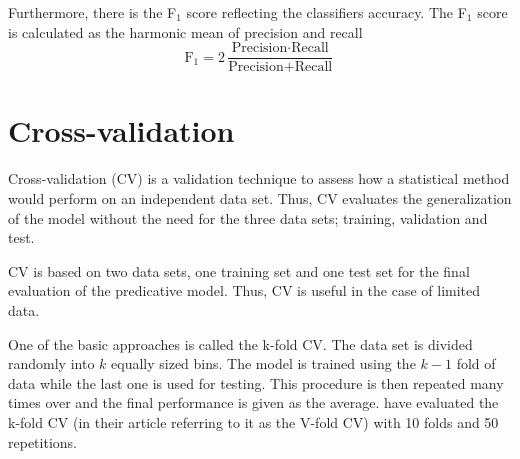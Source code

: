 Furthermore, there is the F$_1$ score reflecting the classifiers accuracy. The F$_1$ score is calculated as the harmonic mean of precision and recall \citep{powers2011}
\begin{equation}
    \text{F}_1 = 2\frac{\text{Precision}\cdot \text{Recall}}{\text{Precision}+\text{Recall}}
\end{equation}

\section{Cross-validation}
Cross-validation (CV) is a validation technique to assess how a statistical method would perform on an independent data set. Thus, CV evaluates the generalization of the model without the need for the three data sets; training, validation and test.

CV is based on two data sets, one training set and one test set for the final evaluation of the predicative model. Thus, CV is useful in the case of limited data. 

One of the basic approaches is called the k-fold CV. The data set is divided randomly into $k$ equally sized bins. The model is trained using the $k-1$ fold of data while the last one is used for testing. This procedure is then repeated many times over and the final performance is given as the average. \citet{Krstajic2014} have evaluated the k-fold CV (in their article referring to it as the V-fold CV) with 10 folds and 50 repetitions. 




